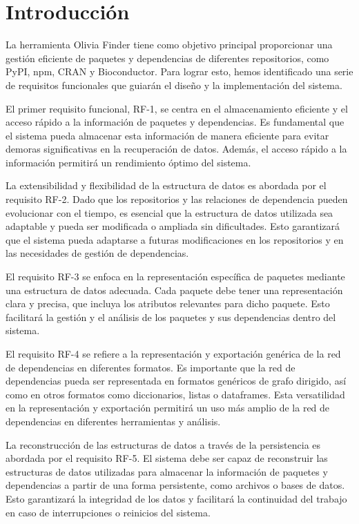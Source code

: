 
\section{Introducción}

La herramienta Olivia Finder tiene como objetivo principal proporcionar una gestión eficiente de paquetes
y dependencias de diferentes repositorios, como PyPI, npm, CRAN y Bioconductor. Para lograr esto, hemos
identificado una serie de requisitos funcionales que guiarán el diseño y la implementación del sistema.

El primer requisito funcional, RF-1, se centra en el almacenamiento eficiente y el acceso rápido a la
información de paquetes y dependencias. Es fundamental que el sistema pueda almacenar esta información
de manera eficiente para evitar demoras significativas en la recuperación de datos. Además, el acceso
rápido a la información permitirá un rendimiento óptimo del sistema.

La extensibilidad y flexibilidad de la estructura de datos es abordada por el requisito RF-2. Dado
que los repositorios y las relaciones de dependencia pueden evolucionar con el tiempo, es esencial que
la estructura de datos utilizada sea adaptable y pueda ser modificada o ampliada sin dificultades. Esto
garantizará que el sistema pueda adaptarse a futuras modificaciones en los repositorios y en las
necesidades de gestión de dependencias.

El requisito RF-3 se enfoca en la representación específica de paquetes mediante una estructura de
datos adecuada. Cada paquete debe tener una representación clara y precisa, que incluya los atributos
relevantes para dicho paquete. Esto facilitará la gestión y el análisis de los paquetes y sus dependencias
dentro del sistema.

El requisito RF-4 se refiere a la representación y exportación genérica de la red de dependencias
en diferentes formatos. Es importante que la red de dependencias pueda ser representada en formatos
genéricos de grafo dirigido, así como en otros formatos como diccionarios, listas o dataframes.
Esta versatilidad en la representación y exportación permitirá un uso más amplio de la red de
dependencias en diferentes herramientas y análisis.

La reconstrucción de las estructuras de datos a través de la persistencia es abordada por el
requisito RF-5. El sistema debe ser capaz de reconstruir las estructuras de datos utilizadas
para almacenar la información de paquetes y dependencias a partir de una forma persistente, como
archivos o bases de datos. Esto garantizará la integridad de los datos y facilitará la continuidad
del trabajo en caso de interrupciones o reinicios del sistema.

